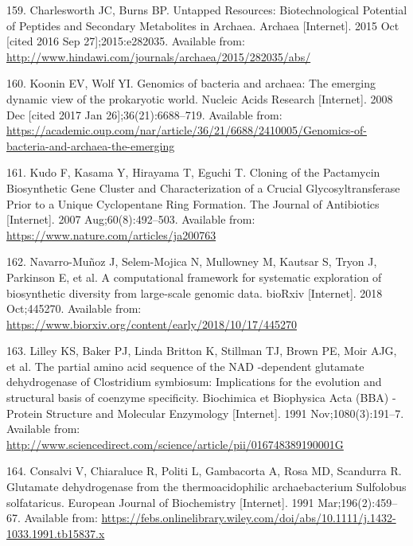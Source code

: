 \documentclass[12pt,twoside]{reedthesis}
\begin{document}
  \hypertarget{ref-charlesworth_untapped_natural_products_Archaea_2015}{}
  159. Charlesworth JC, Burns BP. Untapped Resources: Biotechnological
  Potential of Peptides and Secondary Metabolites in Archaea. Archaea
  {[}Internet{]}. 2015 Oct {[}cited 2016 Sep 27{]};2015:e282035. Available
  from: \url{http://www.hindawi.com/journals/archaea/2015/282035/abs/}
  
  \hypertarget{ref-koonin_genomics_2008}{}
  160. Koonin EV, Wolf YI. Genomics of bacteria and archaea: The emerging
  dynamic view of the prokaryotic world. Nucleic Acids Research
  {[}Internet{]}. 2008 Dec {[}cited 2017 Jan 26{]};36(21):6688--719.
  Available from:
  \url{https://academic.oup.com/nar/article/36/21/6688/2410005/Genomics-of-bacteria-and-archaea-the-emerging}
  
  \hypertarget{ref-kudo_cloning_2007}{}
  161. Kudo F, Kasama Y, Hirayama T, Eguchi T. Cloning of the Pactamycin
  Biosynthetic Gene Cluster and Characterization of a Crucial
  Glycosyltransferase Prior to a Unique Cyclopentane Ring Formation. The
  Journal of Antibiotics {[}Internet{]}. 2007 Aug;60(8):492--503.
  Available from: \url{https://www.nature.com/articles/ja200763}
  
  \hypertarget{ref-navarro-munoz_computational_2018}{}
  162. Navarro-Muñoz J, Selem-Mojica N, Mullowney M, Kautsar S, Tryon J,
  Parkinson E, et al. A computational framework for systematic exploration
  of biosynthetic diversity from large-scale genomic data. bioRxiv
  {[}Internet{]}. 2018 Oct;445270. Available from:
  \url{https://www.biorxiv.org/content/early/2018/10/17/445270}
  
  \hypertarget{ref-lilley_partial_1991}{}
  163. Lilley KS, Baker PJ, Linda Britton K, Stillman TJ, Brown PE, Moir
  AJG, et al. The partial amino acid sequence of the NAD -dependent
  glutamate dehydrogenase of Clostridium symbiosum: Implications for the
  evolution and structural basis of coenzyme specificity. Biochimica et
  Biophysica Acta (BBA) - Protein Structure and Molecular Enzymology
  {[}Internet{]}. 1991 Nov;1080(3):191--7. Available from:
  \url{http://www.sciencedirect.com/science/article/pii/016748389190001G}
  
  \hypertarget{ref-consalvi_glutamate_1991}{}
  164. Consalvi V, Chiaraluce R, Politi L, Gambacorta A, Rosa MD,
  Scandurra R. Glutamate dehydrogenase from the thermoacidophilic
  archaebacterium Sulfolobus solfataricus. European Journal of
  Biochemistry {[}Internet{]}. 1991 Mar;196(2):459--67. Available from:
  \url{https://febs.onlinelibrary.wiley.com/doi/abs/10.1111/j.1432-1033.1991.tb15837.x}
  
\end{document}
